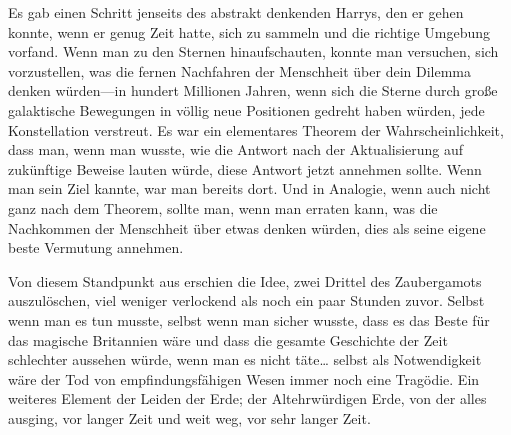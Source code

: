 Es gab einen Schritt jenseits des abstrakt denkenden Harrys, den er gehen konnte, wenn er genug Zeit hatte, sich zu sammeln und die richtige Umgebung vorfand. Wenn man zu den Sternen hinaufschauten, konnte man versuchen, sich vorzustellen, was die fernen Nachfahren der Menschheit über dein Dilemma denken würden—in hundert Millionen Jahren, wenn sich die Sterne durch große galaktische Bewegungen in völlig neue Positionen gedreht haben würden, jede Konstellation verstreut. Es war ein elementares Theorem der Wahrscheinlichkeit, dass man, wenn man wusste, wie die Antwort nach der Aktualisierung auf zukünftige Beweise lauten würde, diese Antwort jetzt annehmen sollte. Wenn man sein Ziel kannte, war man bereits dort. Und in Analogie, wenn auch nicht ganz nach dem Theorem, sollte man, wenn man erraten kann, was die Nachkommen der Menschheit über etwas denken würden, dies als seine eigene beste Vermutung annehmen.

Von diesem Standpunkt aus erschien die Idee, zwei Drittel des Zaubergamots auszulöschen, viel weniger verlockend als noch ein paar Stunden zuvor. Selbst wenn man es tun musste, selbst wenn man sicher wusste, dass es das Beste für das magische Britannien wäre und dass die gesamte Geschichte der Zeit schlechter aussehen würde, wenn man es nicht täte… selbst als Notwendigkeit wäre der Tod von empfindungsfähigen Wesen immer noch eine Tragödie. Ein weiteres Element der Leiden der Erde; der Altehrwürdigen Erde, von der alles ausging, vor langer Zeit und weit weg, vor sehr langer Zeit.

